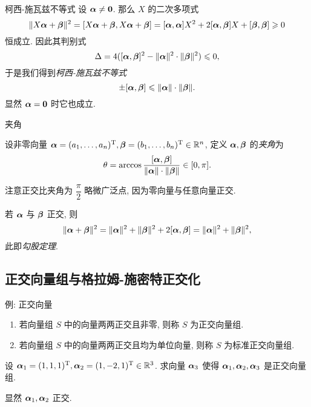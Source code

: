 \begin{frame}{柯西-施瓦兹不等式\noexer}
	\onslide<+->
	设 $\bma\neq{\bf0}$.
	\onslide<+->
	那么 $X$ 的二次多项式
	\[\|X\bma+\bmb\|^2=[X\bma+\bmb,X\bma+\bmb]
	=[\bma,\bma]X^2+2[\bma,\bmb]X+[\bmb,\bmb]\ge0\]
	恒成立.
	\onslide<+->
	因此其判别式
	\[\Delta=4([\bma,\bmb]^2-\|\bma\|^2\cdot\|\bmb\|^2)\le 0,\]
	\onslide<+->
	于是我们得到\emph{柯西-施瓦兹不等式}
	\[\pm[\bma,\bmb]\le \|\bma\|\cdot\|\bmb\|.\]
	\onslide<+->
	显然 $\bma={\bf0}$ 时它也成立.
\end{frame}


\begin{frame}{夹角}
	\onslide<+->
	\begin{definition}
		设非零向量 $\bma=(a_1,\dots,a_n)^\rmT,\bmb=(b_1,\dots,b_n)^\rmT\in\BR^n$, 定义 $\bma,\bmb$ 的\emph{夹角}为
		\[\theta=\arccos\dfrac{[\bma,\bmb]}{\|\bma\|\cdot\|\bmb\|}\in[0,\pi].\]
	\end{definition}
	\onslide<+->
	注意正交比夹角为 $\dfrac\pi2$ 略微广泛点, 因为零向量与任意向量正交.

	\onslide<+->
	若 $\bma$ 与 $\bmb$ 正交, 则
	\[\|\bma+\bmb\|^2=\|\bma\|^2+\|\bmb\|^2+2[\bma,\bmb]=\|\bma\|^2+\|\bmb\|^2,\]
	\onslide<+->
	此即\emph{勾股定理}.
\end{frame}

\subsection{正交向量组与格拉姆-施密特正交化}

\begin{frame}{例: 正交向量}
	\onslide<+->
	\begin{definition}
		\begin{enumerate}
			\item 若向量组 $S$ 中的向量两两正交且非零, 则称 $S$ 为正交向量组.
			\item 若向量组 $S$ 中的向量两两正交且均为单位向量, 则称 $S$ 为标准正交向量组.
		\end{enumerate}
	\end{definition}
	\onslide<+->
	\begin{example}
		设 $\bma_1=(1,1,1)^\rmT,\bma_2=(1,-2,1)^\rmT\in\BR^3$.
		求向量 $\bma_3$ 使得 $\bma_1,\bma_2,\bma_3$ 是正交向量组.
	\end{example}
	\onslide<+->
	\begin{solution}
		显然 $\bma_1,\bma_2$ 正交.
		\onslide<+->{%
			故可取 $\bma_3=(1,0,-1)^\rmT$.
		}
	\end{solution}
\end{frame}


